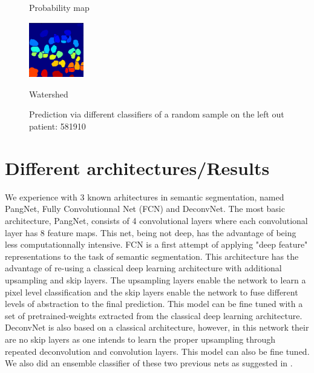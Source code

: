 \documentclass{article}
\begin{document}
\begin{figure}[htb]
\begin{minipage}[b]{.32\linewidth}
  \centerline{Probability map}\medskip
\end{minipage}
\hfill
\begin{minipage}[b]{.32\linewidth}
  \centering
  \centerline{\includegraphics[height=2.4cm]{FCN_WS}}
  \centerline{Watershed}\medskip
\end{minipage}
%
\caption{Prediction via different classifiers of a random sample on the left out patient: 581910}
\label{fig:prediction}
%
\end{figure}




\section{Different architectures/Results}
\label{sec:results}
We experience with 3 known arhitectures in semantic segmentation,
named PangNet, Fully Convolutionnal Net (FCN) and DeconvNet. The most
basic architecture, PangNet, consists of 4  
convolutional layers where each convolutional layer has 8 feature
maps\cite{pang2010cell}.  
This net, being not deep, has the advantage of being less 
computationnally intensive. FCN is a first attempt of applying "deep 
feature" representations to the task of semantic segmentation. This 
architecture has the advantage of re-using a classical deep learning 
architecture with additional upsampling and skip layers. The 
upsampling layers enable the network to learn a pixel level classification 
and the skip layers enable the network to fuse different levels of 
abstraction to the final prediction. This model can be fine tuned with a 
set of pretrained-weights extracted from the classical deep learning 
architecture\cite{long2015fcn}. DeconvNet is also based on a classical architecture, 
however, in this network their are no skip layers as one intends to learn 
the proper upsampling through repeated deconvolution and convolution 
layers. This model can also be fine tuned\cite{noh2015learning}. We also did an
ensemble classifier of these two previous nets as suggested in 
\cite{noh2015learning}.
\end{document}

